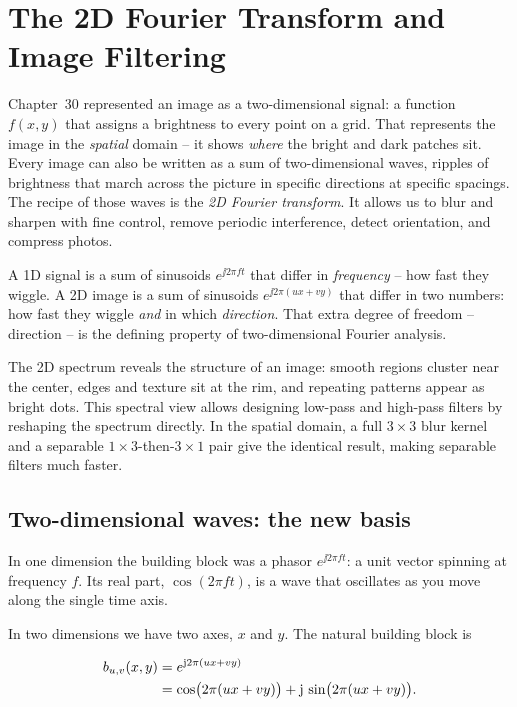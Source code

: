 \chapter{The 2D Fourier Transform and Image Filtering}

Chapter~30 represented an image as a two-dimensional signal: a
function $f(x,y)$ that assigns a brightness to every point on a grid. That represents the image in the \emph{spatial} domain -- it shows
\emph{where} the bright and dark patches sit. Every image can also be written as a sum of two-dimensional waves,
ripples of brightness that march across the picture in specific directions at specific
spacings. The recipe of those waves is the \emph{2D Fourier transform}. It allows us to blur and sharpen with fine control, remove periodic interference,
detect orientation, and compress photos.

A 1D signal is a sum of
sinusoids $e^{\jj 2\pi f t}$ that differ in \emph{frequency} -- how fast they
wiggle. A 2D image is a sum of sinusoids $e^{\jj 2\pi (ux + vy)}$ that differ in
two numbers: how fast they wiggle \emph{and} in which \emph{direction}. That extra
degree of freedom -- direction -- is the defining property of two-dimensional
Fourier analysis.

\begin{focusbox}
The 2D spectrum reveals the structure of an image: smooth regions cluster near the center, edges and texture sit at the rim, and repeating patterns appear as bright dots. This spectral view allows designing low-pass and high-pass filters by reshaping the spectrum directly. In the spatial domain, a full $3\times3$ blur kernel and a separable $1\times3$-then-$3\times1$ pair give the identical result, making separable filters much faster.
\end{focusbox}

\section{Two-dimensional waves: the new basis}
\label{ch31:2d-waves}

In one dimension the building block was a phasor $e^{\jj 2\pi f t}$: a unit vector
spinning at frequency $f$. Its real part, $\cos(2\pi f t)$, is a wave that
oscillates as you move along the single time axis.

In two dimensions we have two axes, $x$ and $y$. The natural building block is

\begin{align}
b_{u,v}(x,y) &= e^{\mathrm{j} 2\pi (u x + v y)} \notag \\
&= \cos\!\big(2\pi(ux+vy)\big) + \mathrm{j}\,\sin\!\big(2\pi(ux+vy)\big).
\label{ch31:basis}
\end{align}

